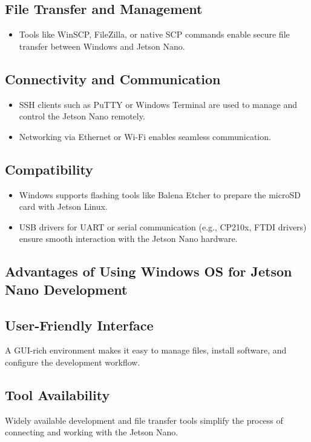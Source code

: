 \subsection*{File Transfer and Management}
\begin{itemize}
	\item Tools like WinSCP, FileZilla, or native SCP commands enable secure file transfer between Windows and Jetson Nano.
\end{itemize}

\subsection*{Connectivity and Communication}
\begin{itemize}
	\item SSH clients such as PuTTY or Windows Terminal are used to manage and control the Jetson Nano remotely.
	\item Networking via Ethernet or Wi-Fi enables seamless communication.
\end{itemize}

\subsection*{Compatibility}
\begin{itemize}
	\item Windows supports flashing tools like Balena Etcher to prepare the microSD card with Jetson Linux.
	\item USB drivers for UART or serial communication (e.g., CP210x, FTDI drivers) ensure smooth interaction with the Jetson Nano hardware.
\end{itemize}

\subsection{Advantages of Using Windows OS for Jetson Nano Development}
\subsection*{User-Friendly Interface}
A GUI-rich environment makes it easy to manage files, install software, and configure the development workflow.

\subsection*{Tool Availability}
Widely available development and file transfer tools simplify the process of connecting and working with the Jetson Nano.

